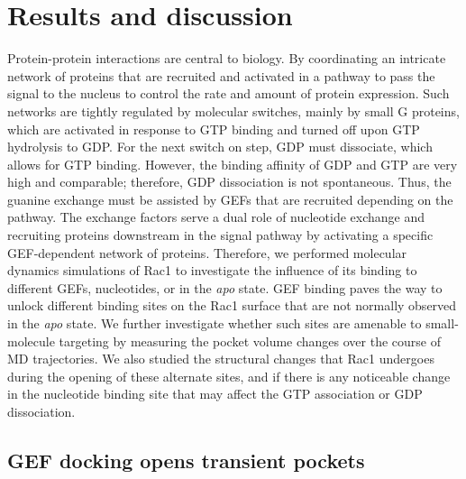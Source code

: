 \documentclass[12pt,a4paper]{achemso}
\begin{document}
\section{Results and discussion}
Protein-protein interactions are central to biology. By coordinating an intricate network of proteins that are recruited and activated in a pathway to pass the signal to the nucleus to control the rate and amount of protein expression. Such networks are tightly regulated by molecular switches, mainly by small G proteins, which are activated in response to GTP binding and turned off upon GTP hydrolysis to GDP. For the next switch on step, GDP must dissociate, which allows for GTP binding. However, the binding affinity of GDP and GTP are very high and comparable; therefore, GDP dissociation is not spontaneous. Thus, the guanine exchange must be assisted by GEFs that are recruited depending on the pathway. The exchange factors serve a dual role of nucleotide exchange and recruiting proteins downstream in the signal pathway by activating a specific GEF-dependent network of proteins. Therefore, we performed molecular dynamics simulations of Rac1 to investigate the influence of its binding to different GEFs, nucleotides, or in the \textit{apo} state. GEF binding paves the way to unlock different binding sites on the Rac1 surface that are not normally observed in the \textit{apo} state. We further investigate whether such sites are amenable to small-molecule targeting by measuring the pocket volume changes over the course of MD trajectories. We also studied the structural changes that Rac1 undergoes during the opening of these alternate sites, and if there is any noticeable change in the nucleotide binding site that may affect the GTP association or GDP dissociation. 

\subsection{GEF docking opens transient pockets}
\end{document}
